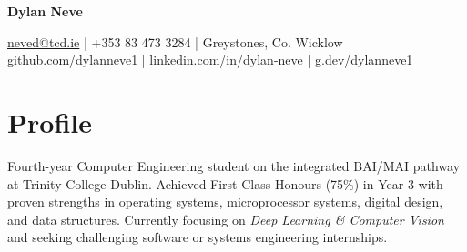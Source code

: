 \documentclass[10pt,a4paper]{article}
\begin{document}
\begin{center}
    {\Huge \bfseries Dylan Neve}
\end{center}
\begin{center}
    \href{mailto:neved@tcd.ie}{neved@tcd.ie} | +353 83 473 3284 | Greystones, Co. Wicklow \\
    \href{https://github.com/dylanneve1}{github.com/dylanneve1} | \href{https://linkedin.com/in/dylan-neve}{linkedin.com/in/dylan-neve} | \href{https://g.dev/dylanneve1}{g.dev/dylanneve1}
\end{center}


\section*{Profile}
Fourth-year Computer Engineering student on the integrated BAI/MAI pathway at Trinity College Dublin. Achieved First Class Honours (75\%) in Year 3 with proven strengths in operating systems, microprocessor systems, digital design, and data structures. Currently focusing on \textit{Deep Learning \& Computer Vision} and seeking challenging software or systems engineering internships.


\end{document}
